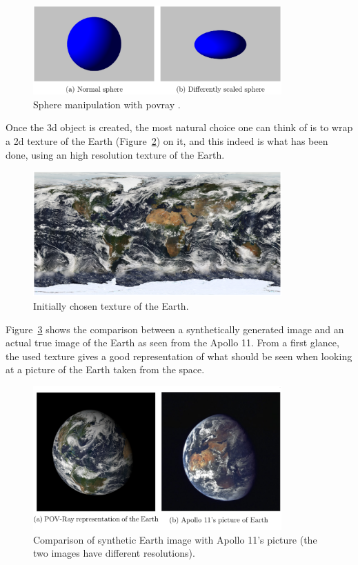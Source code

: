 \begin{figure}[htbp]
  \centering
  \includegraphics[width=0.85\textwidth]{gfx/sphere_scaling.eps}
  \caption{Sphere manipulation with \acrshort{povray} \cite{jacopo}.}
  \label{fig:spherescaling}
\end{figure}

Once the \acrshort{3d} object is created, the most natural choice one can think of is to wrap a \acrshort{2d} texture of the Earth (Figure~\ref{fig:firstTexture}) on it, and this indeed is what has been done, using an high resolution texture of the Earth.

\begin{figure}[htbp]
  \centering
  \includegraphics[width=0.85\textwidth]{gfx/first_text.eps}
  \caption{Initially chosen texture of the Earth.}
  \label{fig:firstTexture}
\end{figure}

\bigskip

Figure~\ref{fig:EarthApollo} shows the comparison between a synthetically generated image and an actual true image of the Earth as seen from the Apollo 11. From a first glance, the used texture gives a good representation of what should be seen when looking at a picture of the Earth taken from the space.

\begin{figure}[htbp]
  \centering
  \includegraphics[width=0.85\textwidth]{gfx/earthApolloOurs.eps}
  \caption{Comparison of synthetic Earth image with Apollo 11's picture (the two images have different resolutions).}
  \label{fig:EarthApollo}
\end{figure}


